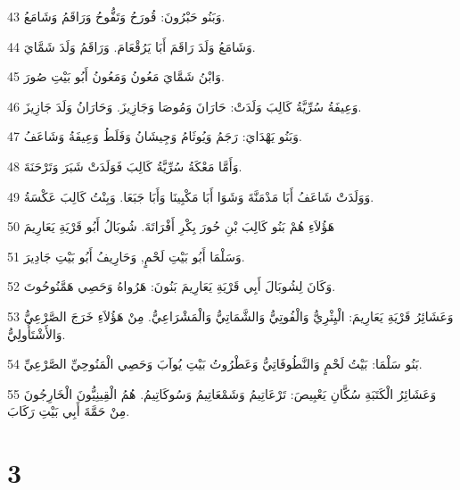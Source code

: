 \par 43 وَبَنُو حَبْرُونَ: قُورَحُ وَتَفُّوحُ وَرَاقَمُ وَشَامَعُ.
\par 44 وَشَامَعُ وَلَدَ رَاقَمَ أَبَا يَرُقْعَامَ. وَرَاقَمُ وَلَدَ شَمَّايَ.
\par 45 وَابْنُ شَمَّايَ مَعُونُ وَمَعُونُ أَبُو بَيْتِ صُورَ.
\par 46 وَعِيفَةُ سُرِّيَّةُ كَالِبَ وَلَدَتْ: حَارَانَ وَمُوصَا وَجَازِيزَ. وَحَارَانُ وَلَدَ جَازِيزَ.
\par 47 وَبَنُو يَهْدَايَ: رَجَمُ وَيُوثَامُ وَجِيشَانُ وَفَلَطُ وَعِيفَةُ وَشَاعَفُ.
\par 48 وَأَمَّا مَعْكَةُ سُرِّيَّةُ كَالِبَ فَوَلَدَتْ شَبَرَ وَتَرْحَنَةَ.
\par 49 وَوَلَدَتْ شَاعَفُ أَبَا مَدْمَنَّةَ وَشَوَا أَبَا مَكْبِينَا وَأَبَا جَبَعَا. وَبِنْتُ كَالِبَ عَكْسَةُ.
\par 50 هَؤُلاَءِ هُمْ بَنُو كَالِبَ بْنِ حُورَ بِكْرِ أَفْرَاتَةَ. شُوبَالُ أَبُو قَرْيَةِ يَعَارِيمَ
\par 51 وَسَلْمَا أَبُو بَيْتِ لَحْمٍ, وَحَارِيفُ أَبُو بَيْتِ جَادِيرَ.
\par 52 وَكَانَ لِشُوبَالَ أَبِي قَرْيَةِ يَعَارِيمَ بَنُونَ: هَرُواهُ وَحَصِي هَمَّنُوحُوتَ.
\par 53 وَعَشَائِرُ قَرْيَةِ يَعَارِيمَ: الْيِثْرِيُّ وَالْفُوتِيُّ وَالشَّمَاتِيُّ وَالْمَشْرَاعِيُّ. مِنْ هَؤُلاَءِ خَرَجَ الصَّرْعِيُّ وَالأَشْتَأُولِيُّ.
\par 54 بَنُو سَلْمَا: بَيْتُ لَحْمٍ وَالنَّطُوفَاتِيُّ وَعَطْرُوتُ بَيْتِ يُوآبَ وَحَصِي الْمَنُوحِيِّ الصَّرْعِيِّ.
\par 55 وَعَشَائِرُ الْكَتَبَةِ سُكَّانِ يَعْبِيصَ: تَرْعَاتِيمُ وَشَمْعَاتِيمُ وَسُوكَاتِيمُ. هُمُ الْقِينِيُّونَ الْخَارِجُونَ مِنْ حَمَّةَ أَبِي بَيْتِ رَكَابَ.

\chapter{3}

